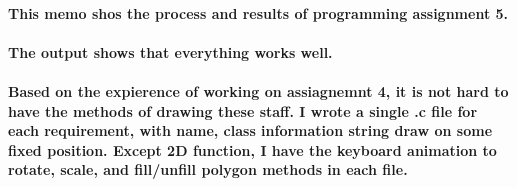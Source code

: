 \documentclass[a4paper,12pt]{texMemo}
\begin{document}
\maketitle

\paragraph{This memo shos the process and results of programming assignment 5.}
\paragraph{The output shows that everything works well. }
\paragraph{Based on the expierence of working on assiagnemnt 4, it is not hard to have the methods of drawing these staff. I wrote a single .c file for each requirement, with name, class information string draw on some fixed position. Except 2D function, I have the keyboard animation to rotate, scale, and fill/unfill polygon methods in each file.}
\end{document}
